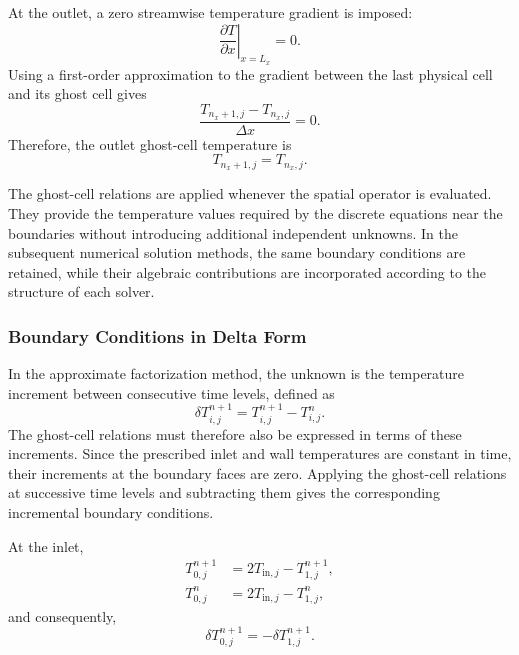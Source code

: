At the outlet, a zero streamwise temperature gradient is imposed:
\begin{equation}
\left.\frac{\partial T}{\partial x}\right|_{x=L_x}=0.
\label{eq:outlet_zero_gradient}
\end{equation}
Using a first-order approximation to the gradient between the
last physical cell and its ghost cell gives
\begin{equation}
\frac{T_{n_x+1,j}-T_{n_x,j}}{\Delta x}=0.
\end{equation}
Therefore, the outlet ghost-cell temperature is
\begin{equation}
\boxed{
T_{n_x+1,j}=T_{n_x,j}.
}
\label{eq:ghost_outlet}
\end{equation}

The ghost-cell relations are applied whenever the spatial operator
is evaluated. They provide the temperature values required by the
discrete equations near the boundaries without introducing
additional independent unknowns. In the subsequent numerical
solution methods, the same boundary conditions are retained, while
their algebraic contributions are incorporated according to the
structure of each solver.

\subsubsection{Boundary Conditions in Delta Form}

In the approximate factorization method, the unknown is the
temperature increment between consecutive time levels, defined as
\begin{equation}
\delta T_{i,j}^{n+1}
=
T_{i,j}^{n+1}-T_{i,j}^{n}.
\label{eq:delta_temperature}
\end{equation}
The ghost-cell relations must therefore also be expressed in terms
of these increments. Since the prescribed inlet and wall
temperatures are constant in time, their increments at the
boundary faces are zero. Applying the ghost-cell relations at
successive time levels and subtracting them gives the corresponding
incremental boundary conditions.

At the inlet,
\begin{equation}
\begin{aligned}
T_{0,j}^{n+1}&=2T_{\mathrm{in},j}-T_{1,j}^{n+1},\\
T_{0,j}^{n}&=2T_{\mathrm{in},j}-T_{1,j}^{n},
\end{aligned}
\end{equation}
and consequently,
\begin{equation}
\boxed{
\delta T_{0,j}^{n+1}
=
-\delta T_{1,j}^{n+1}.
}
\label{eq:delta_ghost_inlet}
\end{equation}

